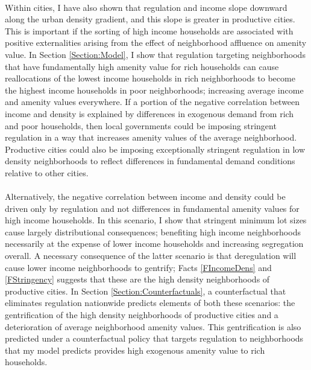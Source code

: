\documentclass[12pt]{article}
\begin{document}
	\paragraph*{}
	Within cities, I have also shown that regulation and income slope downward along the urban density gradient, and this slope is greater in productive cities. This is important if the sorting of high income households are associated with positive externalities arising from the effect of neighborhood affluence on amenity value. In Section \ref{Section:Model}, I show that regulation targeting neighborhoods that have fundamentally high amenity value for rich households can cause reallocations of the lowest income households in rich neighborhoods to become the highest income households in poor neighborhoods; increasing average income and amenity values everywhere. If a portion of the negative correlation between income and density is explained by differences in exogenous demand from rich and poor households, then local governments could be imposing stringent regulation in a way that increases amenity values of the average neighborhood. Productive cities could also be imposing exceptionally stringent regulation in low density neighborhoods to reflect differences in fundamental demand conditions relative to other cities.
	
	\paragraph*{}
	Alternatively, the negative correlation between income and density could be driven only by regulation and not differences in fundamental amenity values for high income households. In this scenario, I show that stringent minimum lot sizes cause largely distributional consequences; benefiting high income neighborhoods necessarily at the expense of lower income households and increasing segregation overall. A necessary consequence of the latter scenario is that deregulation will cause lower income neighborhoods to gentrify; Facts \ref{FIncomeDens} and \ref{FStringency} suggests that these are the high density neighborhoods of productive cities. In Section \ref{Section:Counterfactuals}, a counterfactual that eliminates regulation nationwide predicts elements of both these scenarios: the gentrification of the high density neighborhoods of productive cities and a deterioration of average neighborhood amenity values. This gentrification is also predicted under a counterfactual policy that targets regulation to neighborhoods that my model predicts provides high exogenous amenity value to rich households. 
	
\end{document}
